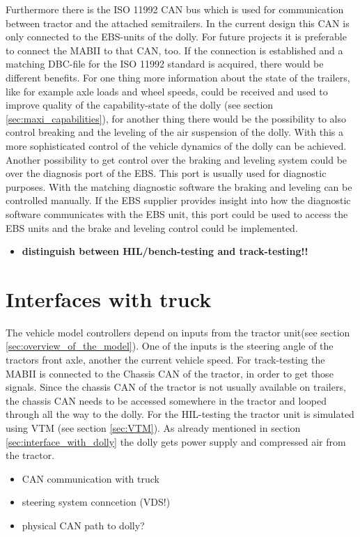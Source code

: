 \documentclass[ExampleMasters.tex]{subfiles}
\begin{document}
	Furthermore there is the ISO 11992 CAN bus which is used for communication between tractor and the attached semitrailers. In the current design this CAN is only connected to the EBS-units of the dolly. For future projects it is preferable to connect the MABII to that CAN, too. If the connection is established and a matching DBC-file for the ISO 11992 standard is acquired, there would be different benefits. For one thing more information about the state of the trailers, like for example axle loads and wheel speeds, could be received and used to improve quality of the capability-state of the dolly (see section \ref{sec:maxi_capabilities}), for another thing there would be the possibility to also control breaking and the leveling of the air suspension of the dolly. With this a more sophisticated control of the vehicle dynamics of the dolly can be achieved.\\
	Another possibility to get control over the braking and leveling system could be over the diagnosis port of the EBS. This port is usually used for diagnostic purposes. With the matching diagnostic software the braking and leveling can be controlled manually. If the EBS supplier provides insight into how the diagnostic software communicates with the EBS unit, this port could be used to access the EBS units and the brake and leveling control could be implemented.
\begin{itemize}	
	\item \textbf{distinguish between HIL/bench-testing and track-testing!!}
\end{itemize}

\section{Interfaces with truck}
\label{sec:interface_with_truck}
The vehicle model controllers depend on inputs from the tractor unit(see section \ref{sec:overview_of_the_model}). One of the inputs is the steering angle of the tractors front axle, another the current vehicle speed. For track-testing the MABII is connected to the Chassis CAN of the tractor, in order to get those signals. Since the chassis CAN of the tractor is not usually available on trailers, the chassis CAN needs to be accessed somewhere in the tractor and looped through all the way to the dolly.   
For the HIL-testing the tractor unit is simulated using VTM (see section \ref{sec:VTM}). As already mentioned in section \ref{sec:interface_with_dolly} the dolly gets power supply and compressed air from the tractor.
\begin{itemize}
	\item CAN communication with truck
	\item steering system conncetion (VDS!)
	\item physical CAN path to dolly?

\end{itemize}
\end{document}
